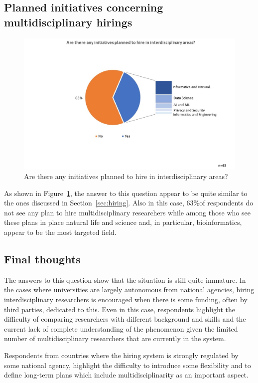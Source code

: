 \subsection{Planned initiatives concerning multidisciplinary hirings}

\begin{figure}[h]
\centering
\includegraphics[width = \linewidth]{charts/3d.jpg}
\caption{Are there any initiatives planned to hire in interdisciplinary areas?}
\label{sect3:planned}
\end{figure}

As shown in Figure~\ref{sect3:planned}, the answer to this question appear to be quite similar to the ones
discussed in Section~\ref{sec:hiring}. Also in this case, 63\%of
respondents do not see any plan to hire multidisciplinary researchers
while among those who see these plans in place natural life and
science and, in particular, bioinformatics, appear to be the most
targeted field. 

\subsection{Final thoughts}

The answers to this question show that the situation is still quite
immature. In the cases where universities are largely autonomous from
national agencies, hiring interdisciplinary researchers is
encouraged when there is some funding, often by third parties, dedicated to
this. Even in this case, respondents highlight the difficulty of comparing
researchers with different background and skills and the current
lack of complete understanding of the phenomenon given the limited
number of multidisciplinary researchers that are currently in the
system. 

Respondents from countries where the hiring system is strongly
regulated by some national agency, highlight the difficulty to
introduce some flexibility and to define long-term plans
which include multidisciplinarity as an important aspect. 